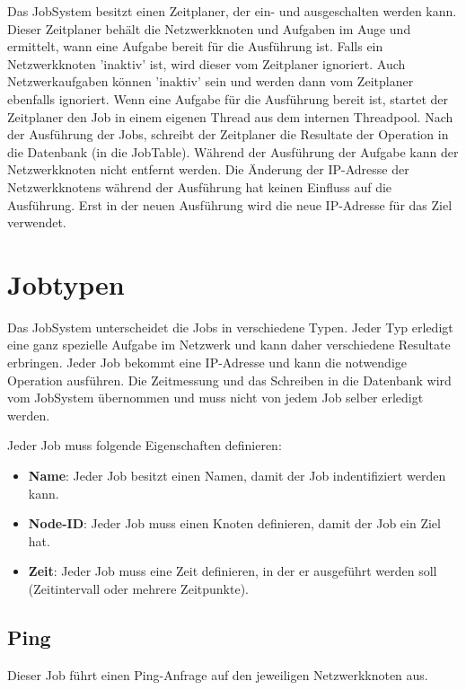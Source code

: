 \documentclass[12pt,a4paper]{report}
\begin{document}
\begin{onehalfspace}
Das JobSystem besitzt einen Zeitplaner, der ein- und ausgeschalten werden kann. Dieser Zeitplaner behält die Netzwerkknoten und Aufgaben im Auge und ermittelt, wann eine Aufgabe bereit für die Ausführung ist. Falls ein Netzwerkknoten 'inaktiv' ist, wird dieser vom Zeitplaner ignoriert. Auch Netzwerkaufgaben können 'inaktiv' sein und werden dann vom Zeitplaner ebenfalls ignoriert. Wenn eine Aufgabe für die Ausführung bereit ist, startet der Zeitplaner den Job in einem eigenen Thread aus dem internen Threadpool. Nach der Ausführung der Jobs, schreibt der Zeitplaner die Resultate der Operation in die Datenbank (in die JobTable). Während der Ausführung der Aufgabe kann der Netzwerkknoten nicht entfernt werden. Die Änderung der IP-Adresse der Netzwerkknotens während der Ausführung hat keinen Einfluss auf die Ausführung. Erst in der neuen Ausführung wird die neue IP-Adresse für das Ziel verwendet.

\section{Jobtypen}

Das JobSystem unterscheidet die Jobs in verschiedene Typen. Jeder Typ erledigt eine ganz spezielle Aufgabe im Netzwerk und kann daher verschiedene Resultate erbringen. Jeder Job bekommt eine IP-Adresse und kann die notwendige Operation ausführen. Die Zeitmessung und das Schreiben in die Datenbank wird vom JobSystem übernommen und muss nicht von jedem Job selber erledigt werden.

Jeder Job muss folgende Eigenschaften definieren:\\

\begin{itemize}
\item \textbf{Name}: Jeder Job besitzt einen Namen, damit der Job indentifiziert werden kann.
\item \textbf{Node-ID}: Jeder Job muss einen Knoten definieren, damit der Job ein Ziel hat.
\item \textbf{Zeit}: Jeder Job muss eine Zeit definieren, in der er ausgeführt werden soll (Zeitintervall oder mehrere Zeitpunkte).
\end{itemize}

\subsection{Ping} Dieser Job führt einen Ping-Anfrage auf den jeweiligen Netzwerkknoten aus.


\end{onehalfspace}
\end{document}
